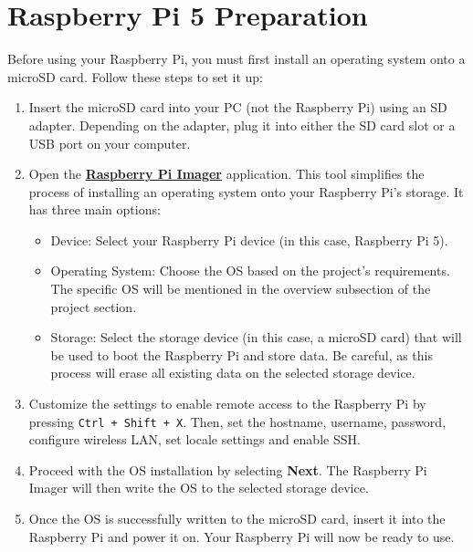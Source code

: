 \section*{ Raspberry Pi 5 Preparation}

Before using your Raspberry Pi, you must first install an operating system onto a microSD card. Follow these steps to set it up:
\begin{enumerate}
\item Insert the microSD card into your PC (not the Raspberry Pi) using an SD adapter. Depending on the adapter, plug it into either the SD card slot or a USB port on your computer.
\item Open the \href{https://www.raspberrypi.com/software}{\textbf{\color{blue}Raspberry Pi Imager}} application. This tool simplifies the process of installing an operating system onto your Raspberry Pi’s storage. It has three main options:
\begin{itemize}
\item Device: Select your Raspberry Pi device (in this case, Raspberry Pi 5).
\item Operating System: Choose the OS based on the project’s requirements. The specific OS will be mentioned in the overview subsection of the project section.
\item Storage: Select the storage device (in this case, a microSD card) that will be used to boot the Raspberry Pi and store data. Be careful, as this process will erase all existing data on the selected storage device.
\end{itemize}
\item Customize the settings to enable remote access to the Raspberry Pi by pressing \texttt{Ctrl + Shift + X}. Then, set the hostname, username, password, configure wireless LAN, set locale settings and enable SSH.
\item Proceed with the OS installation by selecting \textbf{Next}. The Raspberry Pi Imager will then write the OS to the selected storage device.
\item Once the OS is successfully written to the microSD card, insert it into the Raspberry Pi and power it on. Your Raspberry Pi will now be ready to use.
\end{enumerate}

